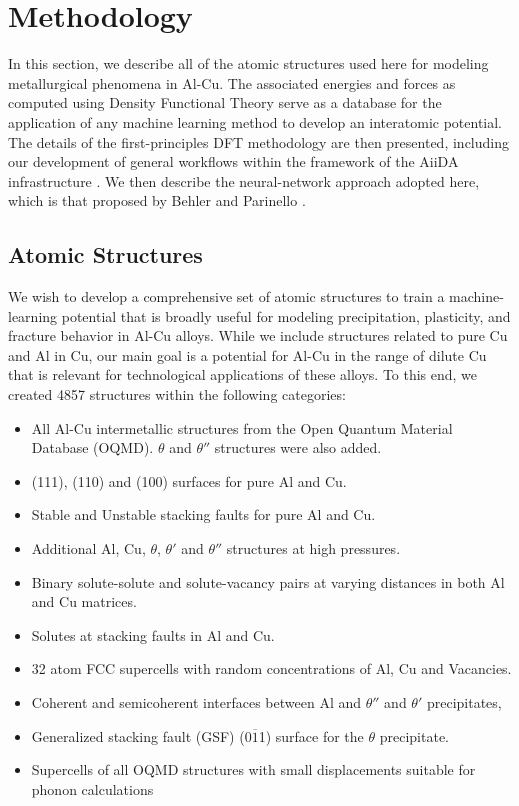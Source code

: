 \documentclass{article}
\begin{document}

\section{Methodology}

In  this section, we describe all of the atomic structures used here for modeling metallurgical phenomena in Al-Cu.  The associated energies and forces as computed using Density Functional Theory serve as a database for the application of any machine learning method to develop an interatomic potential.  The details of the first-principles DFT methodology are then presented, including our development of general workflows within the framework of the AiiDA infrastructure \cite{Huber2020AiiDAProvenance}. 
We then describe the neural-network approach adopted here, which is that proposed by Behler and Parinello \cite{Behler2007GeneralizedSurfaces}.

\subsection{Atomic Structures} \label{sct:atomic_structures}

We wish to develop a comprehensive set of atomic structures to train a machine-learning potential that is broadly useful for modeling precipitation, plasticity, and fracture behavior in Al-Cu alloys.  While we include structures related to pure Cu and Al in Cu, our main goal is a potential for Al-Cu in the range of dilute Cu that is relevant for technological applications of these alloys.  To this end, we created 4857 structures within the following categories:
\begin{itemize}
    \item All Al-Cu intermetallic structures from the Open Quantum Material Database (OQMD)\cite{Kirklin2015}. $\theta$ and $\theta''$ structures were also added. 
    \item (111), (110) and (100) surfaces for pure Al and Cu.
    \item Stable and Unstable stacking faults for pure Al and Cu. 
    \item Additional Al, Cu, $\theta$, $\theta'$ and $\theta''$ structures at high pressures. 
    \item Binary solute-solute and solute-vacancy pairs at varying distances in both Al and Cu matrices.
    \item Solutes at stacking faults in Al and Cu. 
    \item 32 atom FCC supercells with random concentrations of Al, Cu and Vacancies. 
    \item Coherent and semicoherent interfaces between Al and $\theta''$  and $\theta'$ precipitates, 
    \item Generalized stacking fault (GSF) (0$\overline{1}$1) surface for the $\theta$ precipitate. 
    \item Supercells of all OQMD structures with small displacements suitable for phonon calculations
\end{itemize}
\end{document}
